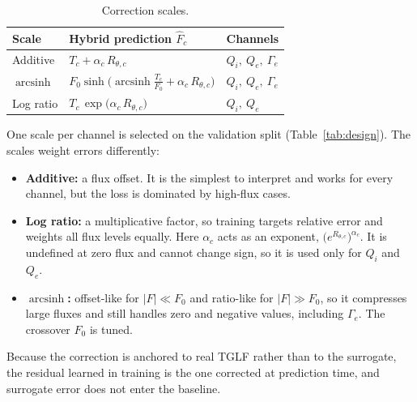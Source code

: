 \documentclass[10pt,letterpaper]{article}
\newcommand{\tablestyle}{\small\renewcommand{\arraystretch}{1.15}\setlength{\parskip}{0pt}}
\begin{document}
\begin{table}[H]
      \tablestyle
      \caption{Correction scales.}
      \label{tab:scales}
      \newcommand{\rowstrut}{\rule[-2.4ex]{0pt}{6.2ex}}%
      \centering
      \begin{tabular}{@{}L{0.9in}L{2.6in}L{1.0in}@{}}
            \toprule
            \textbf{Scale} & \textbf{Hybrid prediction $\widehat F_c$} & \textbf{Channels} \\
            \midrule
            \rowstrut Additive
              & $\displaystyle T_c + \alpha_c\,R_{\theta,c}$
              & $Q_i,\ Q_e,\ \Gamma_e$ \\
            \rowstrut $\operatorname{arcsinh}$
              & $\displaystyle F_0\sinh\!\Big(\operatorname{arcsinh}\frac{T_c}{F_0} + \alpha_c\,R_{\theta,c}\Big)$
              & $Q_i,\ Q_e,\ \Gamma_e$ \\
            \rowstrut Log ratio
              & $\displaystyle T_c\,\exp\!\big(\alpha_c\,R_{\theta,c}\big)$
              & $Q_i,\ Q_e$ \\
            \bottomrule
      \end{tabular}
\end{table}

One scale per channel is selected on the validation split (Table~\ref{tab:design}). The scales weight errors differently:
\begin{itemize}
      \item \textbf{Additive:} a flux offset. It is the simplest to interpret and works for every channel, but the loss is dominated by high-flux cases.
      \item \textbf{Log ratio:} a multiplicative factor, so training targets relative error and weights all flux levels equally. Here $\alpha_c$ acts as an exponent, $\big(e^{R_{\theta,c}}\big)^{\alpha_c}$. It is undefined at zero flux and cannot change sign, so it is used only for $Q_i$ and $Q_e$.
      \item {\boldmath\textbf{$\operatorname{arcsinh}$:}} offset-like for $\lvert F\rvert\ll F_0$ and ratio-like for $\lvert F\rvert\gg F_0$, so it compresses large fluxes and still handles zero and negative values, including $\Gamma_e$. The crossover $F_0$ is tuned.
\end{itemize}

Because the correction is anchored to real TGLF rather than to the surrogate, the residual learned in training is the one corrected at prediction time, and surrogate error does not enter the baseline.
\end{document}
